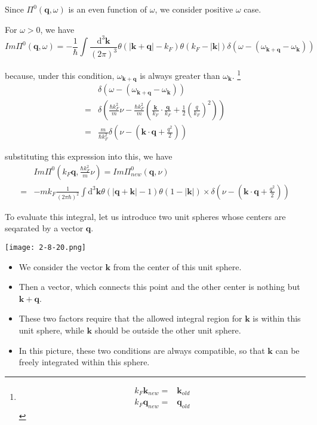 Since $\Pi^0(\mathbf{q},\omega)$ is an even function of $\omega$, we consider positive $\omega$ case.

For $\omega > 0$, we have
\[
Im \Pi^0(\mathbf{q},\omega) = -\frac{1}{\hbar} \int \frac{\mathrm{d}^3 \mathbf{k}}{(2\pi)^3} \theta(|\mathbf{k}+\mathbf{q}|-k_F)\theta(k_F - |\mathbf{k}|) \delta(\omega-(\omega_{\mathbf{k}+\mathbf{q}} - \omega_{\mathbf{k}}))
\]

because, under this condition, $\omega_{\mathbf{k}+\mathbf{q}}$ is always greater than $\omega_{\mathbf{k}}$.
\footnote{\[\begin{split}k_F\mathbf{k}_{new} =& \mathbf{k}_{old}\\
k_F \mathbf{q}_{new} =& \mathbf{q}_{old}\end{split}\]}
\[\begin{split} &\delta(\omega - (\omega_{\mathbf{k}+\mathbf{q}} - \omega_{\mathbf{k}})) \\=& \delta(\frac{\hbar k_F^2}{m}\nu - \frac{\hbar k_F^2}{m}(\frac{\mathbf{k}}{k_F}\cdot \frac{\mathbf{q}}{k_F} + \frac{1}{2}\left( \frac{q}{k_F} \right)^2) )\\
=& \frac{m}{\hbar k_F^2} \delta(\nu - (\mathbf{k}\cdot \mathbf{q} + \frac{q^2}{2}))
\end{split}\]

substituting this expression into this, we have
\[\begin{split}& Im\Pi^0(k_F \mathbf{q}, \frac{\hbar k_F^2}{m}\nu) = Im\Pi^0_{new}(\mathbf{q},\nu)\\
=& -m k_F \frac{1}{(2\pi \hbar)^2} \int \mathrm{d}^3 \mathbf{k} \theta(|\mathbf{q}+\mathbf{k}|-1) \theta(1-|\mathbf{k}|) \times \delta(\nu-(\mathbf{k}\cdot \mathbf{q}+\frac{q^2}{2})) \end{split}\]

To evaluate this integral, let us introduce two unit spheres whose centers are seqarated by a vector $\mathbf{q}$.

\begin{center} \label{Fig2.8.20}
\texttt{[image: 2-8-20.png]}
\end{center}
\begin{itemize}
\item We consider the vector $\mathbf{k}$ from the center of this unit sphere.

\item Then a vector, which connects this point and the other center is nothing but $\mathbf{k}+\mathbf{q}$.

\item These two factors require that the allowed integral region for $\mathbf{k}$ is within this unit sphere, while $\mathbf{k}$ should be outside the other unit sphere.

\item In this picture, these two conditions are always compatible, so that $\mathbf{k}$ can be freely integrated within this sphere.
\end{itemize}

